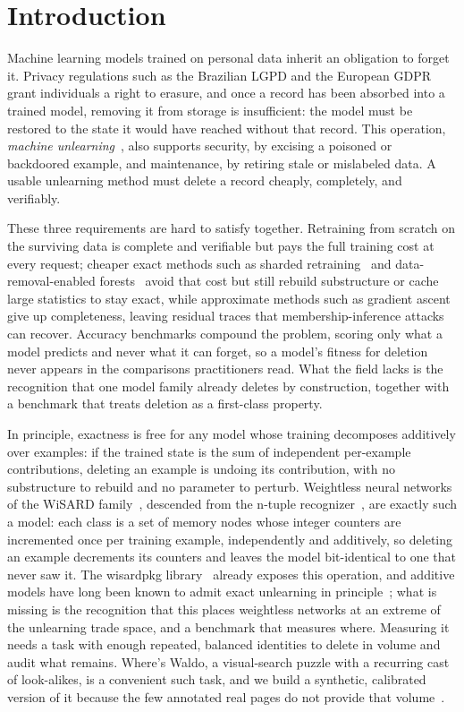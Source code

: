 \section{Introduction}
\label{sec:intro}

Machine learning models trained on personal data inherit an obligation to forget it. Privacy regulations such as the Brazilian LGPD and the European GDPR grant individuals a right to erasure, and once a record has been absorbed into a trained model, removing it from storage is insufficient: the model must be restored to the state it would have reached without that record. This operation, \emph{machine unlearning}~\cite{caoyang2015,nguyen2022survey,xu2023survey}, also supports security, by excising a poisoned or backdoored example, and maintenance, by retiring stale or mislabeled data. A usable unlearning method must delete a record cheaply, completely, and verifiably.

These three requirements are hard to satisfy together. Retraining from scratch on the surviving data is complete and verifiable but pays the full training cost at every request; cheaper exact methods such as sharded retraining~\cite{bourtoule2021sisa} and data-removal-enabled forests~\cite{brophy2021dare} avoid that cost but still rebuild substructure or cache large statistics to stay exact, while approximate methods such as gradient ascent give up completeness, leaving residual traces that membership-inference attacks~\cite{shokri2017mia,chen2021mia} can recover. Accuracy benchmarks compound the problem, scoring only what a model predicts and never what it can forget, so a model's fitness for deletion never appears in the comparisons practitioners read. What the field lacks is the recognition that one model family already deletes by construction, together with a benchmark that treats deletion as a first-class property.

In principle, exactness is free for any model whose training decomposes additively over examples: if the trained state is the sum of independent per-example contributions, deleting an example is undoing its contribution, with no substructure to rebuild and no parameter to perturb. Weightless neural networks of the WiSARD family~\cite{aleksander1984wisard}, descended from the n-tuple recognizer~\cite{bledsoe1959ntuple}, are exactly such a model: each class is a set of memory nodes whose integer counters are incremented once per training example, independently and additively, so deleting an example decrements its counters and leaves the model bit-identical to one that never saw it. The wisardpkg library~\cite{carvalho2020wisardpkg} already exposes this operation, and additive models have long been known to admit exact unlearning in principle~\cite{caoyang2015}; what is missing is the recognition that this places weightless networks at an extreme of the unlearning trade space, and a benchmark that measures where. Measuring it needs a task with enough repeated, balanced identities to delete in volume and audit what remains. Where's Waldo, a visual-search puzzle with a recurring cast of look-alikes, is a convenient such task, and we build a synthetic, calibrated version of it because the few annotated real pages do not provide that volume~\cite{barthelmes2021wally}.

